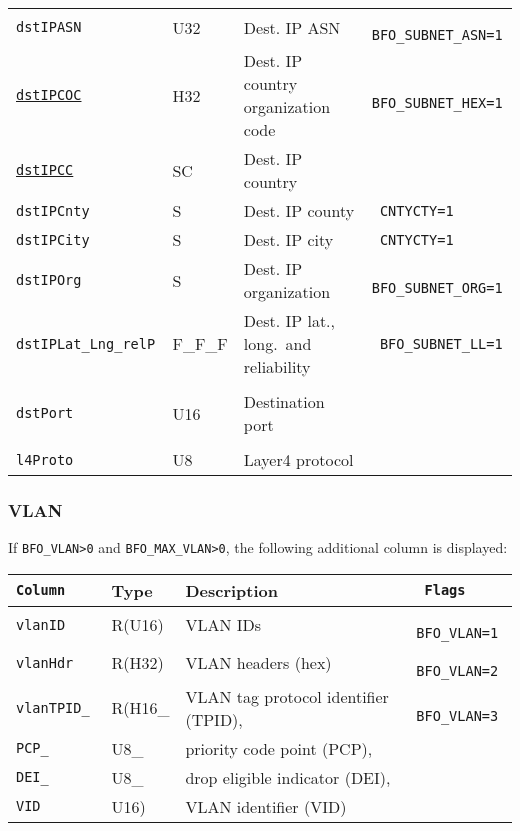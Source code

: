 \documentclass[documentation]{subfiles}
\begin{document}
\begin{longtable}{>{\tt}lll>{\tt\small}l}
    dstIPASN                    & U32     & Dest. IP ASN                           & BFO\_SUBNET\_ASN=1\\
    \hyperref[subnet]{dstIPCOC} & H32     & Dest. IP country organization code     & BFO\_SUBNET\_HEX=1\\
    \hyperref[subnet]{dstIPCC}  & SC      & Dest. IP country                       & \\
    dstIPCnty                   & S       & Dest. IP county                        & CNTYCTY=1\\
    dstIPCity                   & S       & Dest. IP city                          & CNTYCTY=1\\
    dstIPOrg                    & S       & Dest. IP organization                  & BFO\_SUBNET\_ORG=1\\
    dstIPLat\_Lng\_relP         & F\_F\_F & Dest. IP lat., long.\ and reliability  & BFO\_SUBNET\_LL=1\\
    \\
    dstPort                     & U16     & Destination port                       & \\
    \\
    l4Proto                     & U8      & Layer4 protocol                        & \\
    \bottomrule
\end{longtable}

\subsubsection{VLAN}\label{s:bfo:vlan}

If {\tt BFO\_VLAN>0} and {\tt BFO\_MAX\_VLAN>0}, the following additional column is displayed:

\begin{longtable}{>{\tt}lll>{\tt\small}l}
    \toprule
    {\bf Column}        & {\bf Type}    & {\bf Description}                     & {\bf Flags}\\
    \midrule\endhead%
    vlanID              & R(U16)        & VLAN IDs                              & BFO\_VLAN=1\\
    vlanHdr             & R(H32)        & VLAN headers (hex)                    & BFO\_VLAN=2\\
    vlanTPID\_          & R(H16\_       & VLAN tag protocol identifier (TPID),  & BFO\_VLAN=3\\
    \qquad PCP\_        & \qquad U8\_   & \qquad priority code point (PCP),     & \\
    \qquad DEI\_        & \qquad U8\_   & \qquad drop eligible indicator (DEI), & \\
    \qquad VID          & \qquad U16)   & \qquad VLAN identifier (VID)          & \\
    \bottomrule
\end{longtable}
\end{document}
